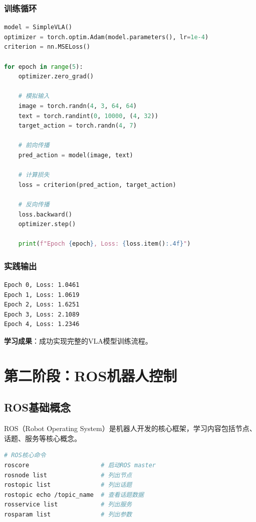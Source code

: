 \documentclass[12pt,a4paper]{article}
\begin{document}
\subsubsection{训练循环}

\begin{lstlisting}[language=Python]
model = SimpleVLA()
optimizer = torch.optim.Adam(model.parameters(), lr=1e-4)
criterion = nn.MSELoss()

for epoch in range(5):
    optimizer.zero_grad()
    
    # 模拟输入
    image = torch.randn(4, 3, 64, 64)
    text = torch.randint(0, 10000, (4, 32))
    target_action = torch.randn(4, 7)
    
    # 前向传播
    pred_action = model(image, text)
    
    # 计算损失
    loss = criterion(pred_action, target_action)
    
    # 反向传播
    loss.backward()
    optimizer.step()
    
    print(f"Epoch {epoch}, Loss: {loss.item():.4f}")
\end{lstlisting}

\subsubsection{实践输出}

\begin{verbatim}
Epoch 0, Loss: 1.0461
Epoch 1, Loss: 1.0619
Epoch 2, Loss: 1.6251
Epoch 3, Loss: 2.1089
Epoch 4, Loss: 1.2346
\end{verbatim}

\textbf{学习成果}：成功实现完整的VLA模型训练流程。

\section{第二阶段：ROS机器人控制}

\subsection{ROS基础概念}

ROS（Robot Operating System）是机器人开发的核心框架，学习内容包括节点、话题、服务等核心概念。

\begin{lstlisting}[language=bash]
# ROS核心命令
roscore                    # 启动ROS master
rosnode list               # 列出节点
rostopic list              # 列出话题
rostopic echo /topic_name  # 查看话题数据
rosservice list            # 列出服务
rosparam list              # 列出参数
\end{lstlisting}
\end{document}
